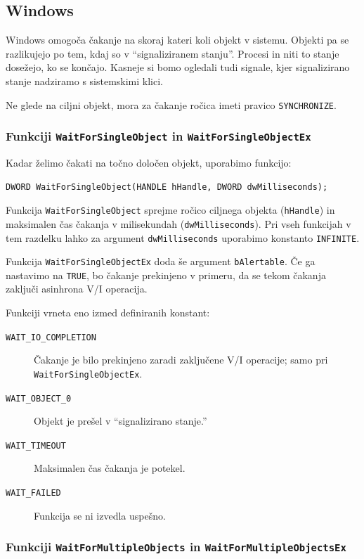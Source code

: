 \documentclass[a4paper,12pt,openright]{book}
\begin{document}
\subsection{Windows} \label{ssec:windows_syscalls:waiting}

Windows omogoča čakanje na skoraj kateri koli objekt v sistemu.
Objekti pa se razlikujejo po tem, kdaj so v ``signaliziranem stanju''.
Procesi in niti to stanje dosežejo, ko se končajo.
Kasneje si bomo ogledali tudi signale, kjer signalizirano stanje nadziramo s sistemskimi klici.

Ne glede na ciljni objekt, mora za čakanje ročica imeti pravico \texttt{SYNCHRONIZE}.

\subsubsection{Funkciji \texttt{WaitForSingleObject} in \texttt{WaitForSingleObjectEx}}

Kadar želimo čakati na točno določen objekt, uporabimo funkcijo:
\begin{lstlisting}[style=func]
 DWORD WaitForSingleObject(HANDLE hHandle, DWORD dwMilliseconds);
\end{lstlisting}

Funkcija \texttt{WaitForSingleObject} sprejme ročico ciljnega objekta (\texttt{hHandle}) in maksimalen čas čakanja v milisekundah (\texttt{dwMilliseconds}).
Pri vseh funkcijah v tem razdelku lahko za argument \texttt{dwMilliseconds} uporabimo konstanto \texttt{INFINITE}.

Funkcija \texttt{WaitForSingleObjectEx} doda še argument \texttt{bAlertable}.
Če ga nastavimo na \texttt{TRUE}, bo čakanje prekinjeno v primeru, da se tekom čakanja zaključi asinhrona V/I operacija.

Funkciji vrneta eno izmed definiranih konstant:
\begin{description}
	\item[\texttt{WAIT\_IO\_COMPLETION}] Čakanje je bilo prekinjeno zaradi zaključene V/I operacije; samo pri \texttt{WaitForSingleObjectEx}.
	\item[\texttt{WAIT\_OBJECT\_0}] Objekt je prešel v ``signalizirano stanje.''
	\item[\texttt{WAIT\_TIMEOUT}] Maksimalen čas čakanja je potekel.
	\item[\texttt{WAIT\_FAILED}] Funkcija se ni izvedla uspešno.
\end{description}

\subsubsection{Funkciji \texttt{WaitForMultipleObjects} in \texttt{WaitForMultipleObjectsEx}}
\end{document}
